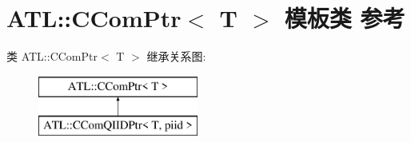 \hypertarget{class_a_t_l_1_1_c_com_ptr}{}\section{A\+TL\+:\+:C\+Com\+Ptr$<$ T $>$ 模板类 参考}
\label{class_a_t_l_1_1_c_com_ptr}
类 A\+TL\+:\+:C\+Com\+Ptr$<$ T $>$ 继承关系图\+:\begin{figure}[H]
\begin{center}
\leavevmode
\includegraphics[height=2.000000cm]{class_a_t_l_1_1_c_com_ptr}
\end{center}
\end{figure}

